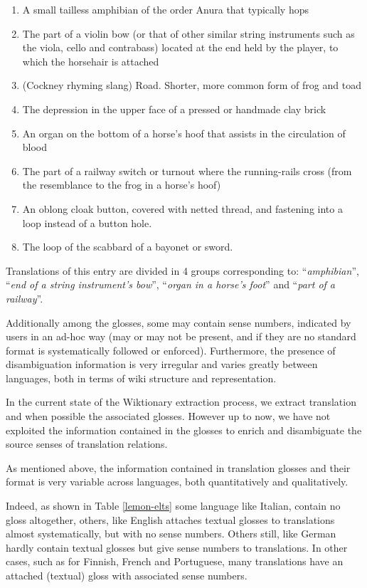 \documentclass[10pt, a4paper]{article}
\begin{document}
\begin{small}\begin{enumerate}
\item A small tailless amphibian of the order Anura that typically hops
\item The part of a violin bow (or that of other similar string instruments such as the viola, cello and contrabass) located at the end held by the player, to which the horsehair is attached
\item (Cockney rhyming slang) Road. Shorter, more common form of frog and toad
\item The depression in the upper face of a pressed or handmade clay brick
\item An organ on the bottom of a horse’s hoof that assists in the circulation of blood
\item The part of a railway switch or turnout where the running-rails cross (from the resemblance to the frog in a horse’s hoof)
\item An oblong cloak button, covered with netted thread, and fastening into a loop instead of a button hole.
\item The loop of the scabbard of a bayonet or sword. 
\end{enumerate}\end{small}

Translations of this entry are divided in 4 groups corresponding to: ``\emph{amphibian}'', ``\emph{end of a string instrument’s bow}'', ``\emph{organ in a horse’s foot}'' and ``\emph{part of a railway}''. 

Additionally among the glosses, some may contain sense numbers, indicated by users in an ad-hoc way (may or may not be present, and if they are no standard format is systematically followed or enforced). Furthermore, the presence of disambiguation information is very irregular and varies greatly between languages, both in terms of wiki structure and representation.

In the current state of the Wiktionary extraction process, we extract translation and when possible the associated glosses. However up to now, we have not exploited the information contained in the glosses to enrich and disambiguate the source senses of translation relations.

As mentioned above, the information contained in translation glosses and their format is very variable across languages, both quantitatively and qualitatively. 

Indeed, as shown in Table \ref{lemon-elts} some language like Italian, contain no gloss altogether, others, like English attaches textual glosses to translations almost systematically, but with no sense numbers. Others still, like German hardly contain textual glosses but give sense numbers to translations. In other cases, such as for Finnish, French and Portuguese, many translations have an attached (textual) gloss with associated sense numbers. 
\end{document}
